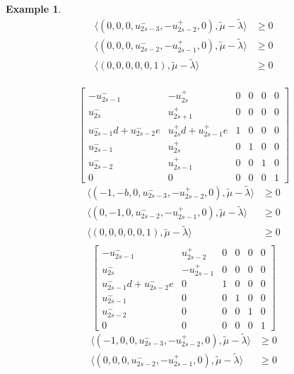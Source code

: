 \documentclass{amsart}
\newtheorem{example}[theorem]{Example}
\numberwithin{theorem}{section}
\begin{document}
  \begin{example}
    \begin{align*}
      \langle (0,0,0,u_{2s-3}^-,-u_{2s-2}^+,0), \tilde\mu - \tilde\lambda\rangle &\ge 0\\ 
      \langle (0,0,0,u_{2s-2}^-,-u_{2s-1}^+,0), \tilde\mu - \tilde\lambda\rangle &\ge 0\\ 
      \langle (0,0,0,0,0,1), \tilde\mu - \tilde\lambda\rangle &\ge 0\\ 
    \end{align*}
  
    \[
      \left[\begin{array}{cccccc} 
        -u_{2s-1}^- & -u_{2s}^+ & 0 & 0 & 0 & 0\\
        u_{2s}^- & u_{2s+1}^+ & 0 & 0 & 0 & 0\\
        u_{2s-1}^-d+u_{2s-2}^-e & u_{2s}^+d+u_{2s-1}^+e & 1 & 0 & 0 & 0\\
        u_{2s-1}^- & u_{2s}^+ & 0 & 1 & 0 & 0\\
        u_{2s-2}^- & u_{2s-1}^+ & 0 & 0 & 1 & 0\\
        0 & 0 & 0 & 0 & 0 & 1
      \end{array}\right]
    \]
    \begin{align*}
      \langle (-1,-b,0,u_{2s-3}^-,-u_{2s-2}^+,0), \tilde\mu - \tilde\lambda\rangle &\ge 0\\ 
      \langle (0,-1,0,u_{2s-2}^-,-u_{2s-1}^+,0), \tilde\mu - \tilde\lambda\rangle &\ge 0\\ 
      \langle (0,0,0,0,0,1), \tilde\mu - \tilde\lambda\rangle &\ge 0\\ 
    \end{align*}
    \[
      \left[\begin{array}{cccccc} 
        -u_{2s-1}^- & u_{2s-2}^+ & 0 & 0 & 0 & 0\\
        u_{2s}^- & -u_{2s-1}^+ & 0 & 0 & 0 & 0\\
        u_{2s-1}^-d+u_{2s-2}^-e & 0 & 1 & 0 & 0 & 0\\
        u_{2s-1}^- & 0 & 0 & 1 & 0 & 0\\
        u_{2s-2}^- & 0 & 0 & 0 & 1 & 0\\
        0 & 0 & 0 & 0 & 0 & 1
      \end{array}\right]
    \]
    \begin{align*}
      \langle (-1,0,0,u_{2s-3}^-,-u_{2s-2}^+,0), \tilde\mu - \tilde\lambda\rangle &\ge 0\\ 
      \langle (0,0,0,u_{2s-2}^-,-u_{2s-1}^+,0), \tilde\mu - \tilde\lambda\rangle &\ge 0\\ 

\end{align*}
\end{example}
\end{document}
